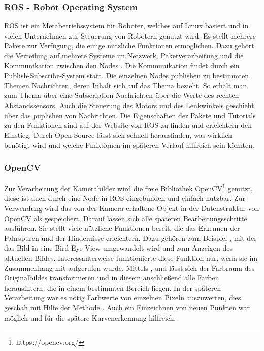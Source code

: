 \subsubsection{ROS - Robot Operating System}
\label{sec:ros}
ROS ist ein Metabetriebssystem für Roboter, welches auf Linux basiert und in vielen Unternehmen zur Steuerung von Robotern genutzt wird. Es stellt mehrere Pakete zur Verfügung, die einige nützliche Funktionen ermöglichen. Dazu gehört die Verteilung auf mehrere Systeme im Netzwerk, Paketverarbeitung und die Kommunikation zwischen den Nodes \cite{einfuehrungROS}.
Die Kommunikation findet durch ein Publish-Subscribe-System statt. Die einzelnen Nodes publishen zu  bestimmten Themen Nachrichten, deren Inhalt sich auf das Thema bezieht. So erhält man zum Thema  über eine Subscription Nachrichten über die Werte des rechten Abstandssensors. Auch die Steuerung des Motors und des Lenkwinkels geschieht über das puplishen von Nachrichten. 
Die Eigenschaften der Pakete und Tutorials zu den Funktionen sind auf der Website von ROS zu finden und erleichtern den Einstieg. Durch Open Source lässt sich schnell herausfinden, was wirklich benötigt wird und welche Funktionen im späteren Verlauf hilfreich sein könnten.

\subsubsection{OpenCV}
\label{sec:openCV}
Zur Verarbeitung der Kamerabilder wird die freie Bibliothek OpenCV\footnote{https://opencv.org/} genutzt, diese ist auch durch eine Node in ROS eingebunden und einfach nutzbar. Zur Verwendung wird das von der Kamera erhaltene Objekt in der Datenstruktur von OpenCV als  gespeichert. Darauf lassen sich alle späteren Bearbeitungsschritte ausführen. 
Sie stellt viele nützliche Funktionen bereit, die das Erkennen der Fahrspuren und der Hindernisse erleichtern. Dazu gehören zum Beispiel , mit der das Bild in eine Bird-Eye View umgewandelt wird und  zum Anzeigen des aktuellen Bildes. Interessanterweise funktionierte diese Funktion nur, wenn sie im Zusammenhang mit  aufgerufen wurde. 
Mittels ,  und  lässt sich der Farbraum des Originalbildes transformieren und in diesem anschließend alle Farben herausfiltern, die in einem bestimmten Bereich liegen. 
In der späteren Verarbeitung war es nötig Farbwerte von einzelnen Pixeln auszuwerten, dies geschah mit Hilfe der Methode . Auch ein Einzeichnen von neuen Punkten war möglich und für die spätere Kurvenerkennung hilfreich. 


